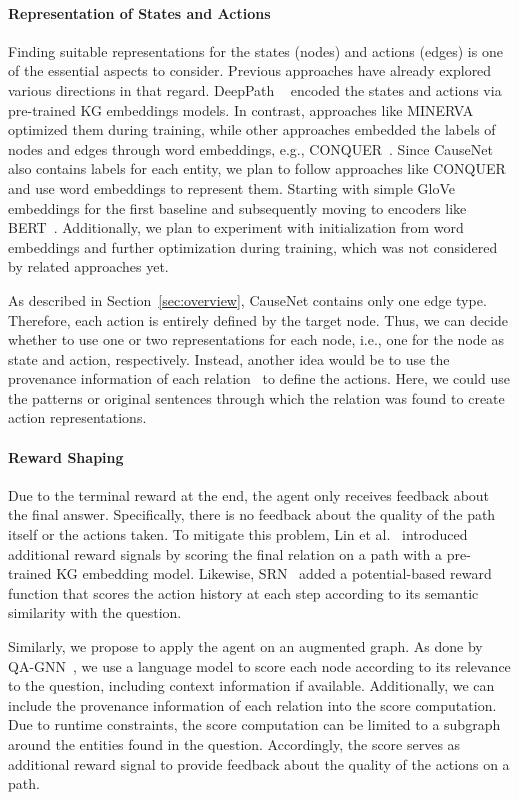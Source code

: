 \paragraph{Representation of States and Actions}
Finding suitable representations for the states (nodes) and actions (edges) is one of the essential aspects to consider. Previous approaches have already explored various directions in that regard. DeepPath ~\cite{Xiong2017DeePpath} encoded the states and actions via pre-trained KG embeddings models. In contrast, approaches like MINERVA~\cite{Das2018Minerva} optimized them during training, while other approaches embedded the labels of nodes and edges through word embeddings, e.g., CONQUER~\cite{Kaiser2021Reinforcement}. Since CauseNet also contains labels for each entity, we plan to follow approaches like CONQUER and use word embeddings to represent them. Starting with simple GloVe~\cite{Pennington2014GLOVE} embeddings for the first baseline and subsequently moving to encoders like BERT~\cite{DevlinBert2019}. Additionally, we plan to experiment with initialization from word embeddings and further optimization during training, which was not considered by related approaches yet. 

As described in Section~\ref{sec:overview}, CauseNet contains only one edge type. Therefore, each action is entirely defined by the target node. Thus, we can decide whether to use one or two representations for each node, i.e., one for the node as state and action, respectively. Instead, another idea would be to use the provenance information of each relation~\cite{Heindorf2020Causenet} to define the actions. Here, we could use the patterns or original sentences through which the relation was found to create action representations.


\paragraph{Reward Shaping}
Due to the terminal reward at the end, the agent only receives feedback about the final answer. Specifically, there is no feedback about the quality of the path itself or the actions taken.
To mitigate this problem, Lin et al.~\cite{Lin2020RewardShaping} introduced additional reward signals by scoring the final relation on a path with a pre-trained KG embedding model. Likewise, SRN~\cite{Qiu2020Stepwise} added a potential-based reward function that scores the action history at each step according to its semantic similarity with the question.

Similarly, we propose to apply the agent on an augmented graph. As done by QA-GNN~\cite{Yasunaga2021QAGNN}, we use a language model to score each node according to its relevance to the question, including context information if available.
Additionally, we can include the provenance information of each relation into the score computation.
Due to runtime constraints, the score computation can be limited to a subgraph around the entities found in the question.
Accordingly, the score serves as additional reward signal to provide feedback about the quality of the actions on a path. 


